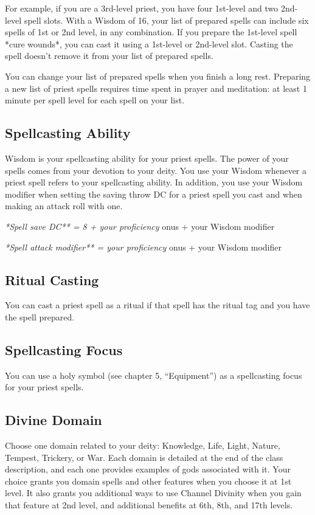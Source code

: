 For example, if you are a 3rd-level priest, you have four
1st-level and two 2nd-level spell slots. With a Wisdom of 16, your list of prepared spells can include six spells of 1st or 2nd level, in any combination. If you prepare the 1st-level spell *cure wounds*, you can cast it using a 1st-level or 2nd-level slot. Casting the spell doesn’t remove it from your list of prepared spells.

You can change your list of prepared spells when you finish a long rest. Preparing a new list of priest spells requires time spent in prayer and meditation: at least 1 minute per spell level for each spell on your list.

\subsection{Spellcasting Ability}

Wisdom is your spellcasting ability for your priest spells. The power of your spells comes from your devotion to your deity. You use your Wisdom whenever a priest spell refers to your spellcasting ability. In addition, you use your Wisdom modifier when setting the saving throw DC for a priest spell you cast and when making an attack roll with one.

\textit{*Spell save DC** = 8 + your proficiency }onus + your Wisdom modifier

\textit{*Spell attack modifier** = your proficiency }onus + your Wisdom modifier

\subsection{Ritual Casting}

You can cast a priest spell as a ritual if that spell has the ritual tag and you have the spell prepared.

\subsection{Spellcasting Focus}

You can use a holy symbol (see chapter 5, “Equipment”) as a spellcasting focus for your priest spells.

\subsection{Divine Domain}

Choose one domain related to your deity: Knowledge, Life, Light, Nature, Tempest, Trickery, or War. Each domain is detailed at the end of the class description, and each one provides examples of gods associated with it. Your choice grants you domain spells and other features when you choose it at 1st level. It also grants you additional ways to use Channel Divinity when you gain that feature at 2nd level, and additional benefits at 6th, 8th, and 17th levels.

